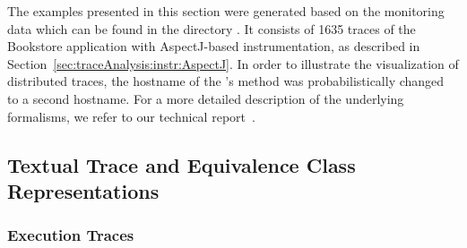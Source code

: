 \newcommand{\OPT}[1]{\texttt{#1}}
\newcommand{\OPTprintValidExecutionTraces}{-\,-print-Execution-Traces}
\newcommand{\OPTprintInvalidExecutionTraces}{-\,-print-invalid-Execution-Traces}
\newcommand{\OPTprintMessageTraces}{-\,-print-Message-Traces}
\newcommand{\OPTprintDeploymentEquivalenceClasses}{-\,-print-Deployment-Equivalence-Classes}
\newcommand{\OPTprintAssemblyEquivalenceClasses}{-\,-print-Assembly-Equivalence-Classes}
\newcommand{\OPTplotDeploymentSequenceDiagrams}{-\,-plot-Deployment-Sequence-Diagrams}
\newcommand{\OPTplotAssemblySequenceDiagrams}{-\,-plot-Assembly-Sequence-Diagrams}
\newcommand{\OPTplotCallTrees}{-\,-plotCallTrees}
\newcommand{\OPTplotAggregatedDeploymentCallTree}{-\,-plot-Aggregated-Deployment-Call-Tree}
\newcommand{\OPTplotAggregatedAssemblyCallTree}{-\,-plot-Aggregated-Assembly-Call-Tree}

\newcommand{\OPTplotContainerDependencyGraph}{-\,-plot-Container-Dependency-Graph}
\newcommand{\OPTplotDeploymentComponentDependencyGraph}{-\,-plot-Deployment-Component-Dependency-Graph}
\newcommand{\OPTplotAssemblyComponentDependencyGraph}{-\,-plot-Assembly-Component-Dependency-Graph}
\newcommand{\OPTplotDeploymentOperationDependencyGraph}{-\,-plot-Deployment-Operation-Dependency-Graph}
\newcommand{\OPTplotAssemblyOperationDependencyGraph}{-\,-plot-Assembly-Operation-Dependency-Graph}

The examples presented in this section were generated based on the %
monitoring data which can be found in the directory %
\dir{\distributedTestdataDirDistro/}. It consists of 1635 traces %
of the Bookstore application with AspectJ-based instrumentation, %
as described in Section~\ref{sec:traceAnalysis:instr:AspectJ}. %
In order to illustrate the visualization of distributed traces, %
the hostname of the 's method  was %
probabilistically changed to a second hostname. %
For a more detailed description of the underlying formalisms, %
we refer to our technical report~\cite{vanHoornRohrHasselbringWallerEhlersFreyKieselhorst2009TRContinuousMonitoringOfSoftwareServicesDesignAndApplicationOfTheKiekerFramework}.

\subsection{Textual Trace and Equivalence Class Representations}

\subsubsection{Execution Traces}\label{sec:example:executionTraces}%

